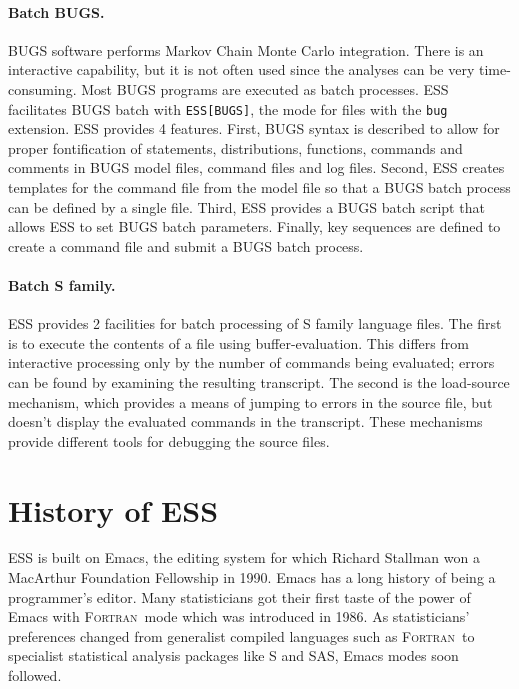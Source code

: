 \documentclass{article}
\newcommand*{\SAS}{\textsc{SAS}}
\newcommand*{\Fortran}{\textsc{Fortran}}
\newcommand{\stexttt}[1]{{\small\texttt{#1}}}
\begin{document}
\paragraph{Batch BUGS.}
BUGS software performs Markov Chain Monte Carlo integration.  There is
an interactive capability, but it is not often used since the analyses
can be very time-consuming.  Most BUGS programs are executed as batch
processes.  ESS facilitates BUGS batch with \stexttt{ESS[BUGS]}, the
mode for files with the \stexttt{bug} extension.  ESS provides 4
features.  First, BUGS syntax is described to allow for proper
fontification of statements, distributions, functions, commands and
comments in BUGS model files, command files and log files.  Second,
ESS creates templates for the command file from the model file so that
a BUGS batch process can be defined by a single file.  Third, ESS
provides a BUGS batch script that allows ESS to set BUGS batch
parameters.  Finally, key sequences are defined to create a command
file and submit a BUGS batch process.

\paragraph{Batch S family.}
ESS provides 2 facilities for batch processing of S family language files.  
The first is to execute the contents of a file using buffer-evaluation.  This
differs from interactive processing only by the number of commands
being evaluated; errors can be found by examining the resulting
transcript.  The second is the load-source mechanism, which provides a
means of jumping to errors in the source file, but doesn't display the
evaluated commands in the transcript.  These mechanisms provide
different tools for debugging the source files.

\section{History of ESS}
\label{sec:ESS:history}

ESS is built on Emacs, the editing system for which Richard Stallman
won a MacArthur Foundation Fellowship in 1990.  Emacs has a long
history of being a programmer's editor.  Many statisticians got their
first taste of the power of Emacs with \Fortran\ mode which was
introduced in 1986.  As statisticians' preferences changed from
generalist compiled languages such as \Fortran\ to specialist
statistical analysis packages like S and \SAS, Emacs modes soon
followed.  
\end{document}
